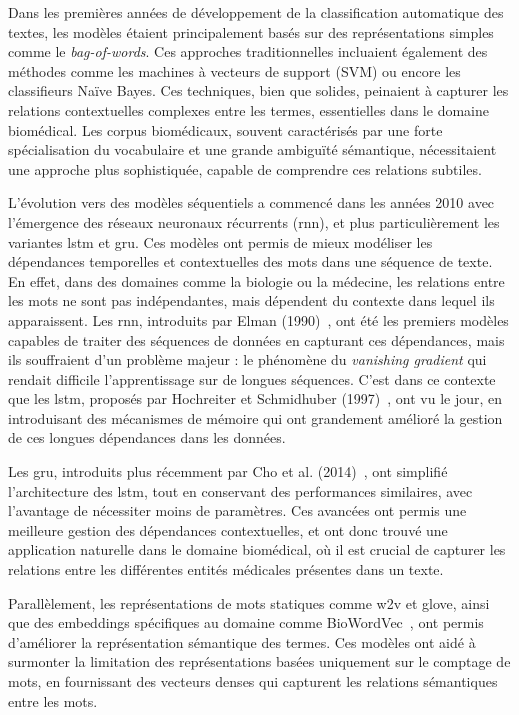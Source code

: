 \documentclass[12pt]{report}
\begin{document}
Dans les premières années de développement de la classification automatique des textes, les modèles étaient principalement basés sur des représentations simples comme le \textit{bag-of-words}. Ces approches traditionnelles incluaient également des méthodes comme les machines à vecteurs de support (SVM) ou encore les classifieurs Naïve Bayes. Ces techniques, bien que solides, peinaient à capturer les relations contextuelles complexes entre les termes, essentielles dans le domaine biomédical. Les corpus biomédicaux, souvent caractérisés par une forte spécialisation du vocabulaire et une grande ambiguïté sémantique, nécessitaient une approche plus sophistiquée, capable de comprendre ces relations subtiles.

L’évolution vers des modèles séquentiels a commencé dans les années 2010 avec l'émergence des réseaux neuronaux récurrents (\gls{rnn}), et plus particulièrement les variantes \gls{lstm} et \gls{gru}. Ces modèles ont permis de mieux modéliser les dépendances temporelles et contextuelles des mots dans une séquence de texte. En effet, dans des domaines comme la biologie ou la médecine, les relations entre les mots ne sont pas indépendantes, mais dépendent du contexte dans lequel ils apparaissent. Les \gls{rnn}, introduits par Elman (1990)~\cite{elman1990finding}, ont été les premiers modèles capables de traiter des séquences de données en capturant ces dépendances, mais ils souffraient d'un problème majeur : le phénomène du \textit{vanishing gradient} qui rendait difficile l'apprentissage sur de longues séquences. C’est dans ce contexte que les \gls{lstm}, proposés par Hochreiter et Schmidhuber (1997)~\cite{hochreiter1997long}, ont vu le jour, en introduisant des mécanismes de mémoire qui ont grandement amélioré la gestion de ces longues dépendances dans les données.

Les \gls{gru}, introduits plus récemment par Cho et al. (2014)~\cite{cho2014learning}, ont simplifié l'architecture des \gls{lstm}, tout en conservant des performances similaires, avec l'avantage de nécessiter moins de paramètres. Ces avancées ont permis une meilleure gestion des dépendances contextuelles, et ont donc trouvé une application naturelle dans le domaine biomédical, où il est crucial de capturer les relations entre les différentes entités médicales présentes dans un texte.

Parallèlement, les représentations de mots statiques comme \gls{w2v} et \gls{glove}, ainsi que des embeddings spécifiques au domaine comme BioWordVec~\cite{zhang2020biowordvec}, ont permis d’améliorer la représentation sémantique des termes. Ces modèles ont aidé à surmonter la limitation des représentations basées uniquement sur le comptage de mots, en fournissant des vecteurs denses qui capturent les relations sémantiques entre les mots.
\end{document}
